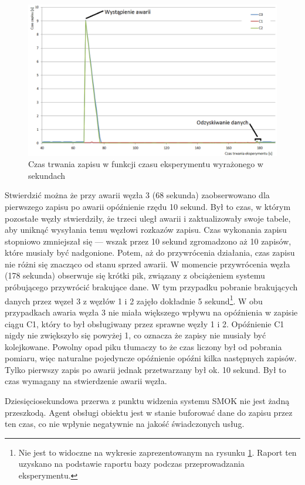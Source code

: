 \documentclass[a4paper,polish,12pt,twoside]{article}
\begin{document}
	\begin{figure}[h]
		\centering \includegraphics[width=15cm]{failtest1}
		\caption{Czas trwania zapisu w funkcji czasu eksperymentu wyrażonego w sekundach}
		\label{fig:failtest1}
	\end{figure}

Stwierdzić można że przy awarii węzła 3 (68 sekunda) zaobserwowano dla pierwszego zapisu po awarii opóźnienie rzędu 10 sekund. Był to czas, w którym pozostałe węzły stwierdziły, że trzeci uległ awarii i zaktualizowały swoje tabele, aby uniknąć wysyłania temu węzłowi rozkazów zapisu. Czas wykonania zapisu stopniowo zmniejszał się --- wszak przez 10 sekund zgromadzono aż 10 zapisów, które musiały być nadgonione. Potem, aż do przywrócenia działania, czas zapisu nie różni się znacząco od stanu sprzed awarii. W momencie przywrócenia węzła (178 sekunda) obserwuje się krótki pik, związany z obciążeniem systemu próbującego przywrócić brakujące dane. W tym przypadku pobranie brakujących danych przez węzeł 3 z węzłów 1 i 2 zajęło dokładnie 5 sekund\footnote{Nie jest to widoczne na wykresie zaprezentowanym na rysunku \ref{fig:failtest1}. Raport ten uzyskano na podstawie raportu bazy podczas przeprowadzania eksperymentu.}. W obu przypadkach awaria węzła 3 nie miała większego wpływu na opóźnienia w zapisie ciągu C1, który to był obsługiwany przez sprawne węzły 1 i 2. Opóźnienie C1 nigdy nie zwiększyło się powyżej 1, co oznacza że zapisy nie musiały być kolejkowane. Powolny opad piku tłumaczy to że czas liczony był od pobrania pomiaru, więc naturalne pojedyncze opóźnienie opóźni kilka następnych zapisów. Tylko pierwszy zapis po awarii jednak przetwarzany był ok. 10 sekund. Był to czas wymagany na stwierdzenie awarii węzła.

Dziesięciosekundowa przerwa z punktu widzenia systemu SMOK nie jest żadną przeszkodą. Agent obsługi obiektu jest w stanie buforować dane do zapisu przez ten czas, co nie wpłynie negatywnie na jakość świadczonych usług.
\end{document}
